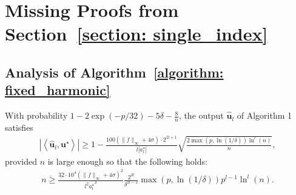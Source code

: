 \documentclass[final,12pt]{colt2018} %
\renewcommand\v[1]{{\ensuremath{\boldsymbol{#1}}}}
\newcommand\ip[1]{\left\langle #1 \right\rangle}
\begin{document}
\section{Missing Proofs from Section~\ref{section: single_index} }
\label{section: single_index_proofs}

\subsection{Analysis of Algorithm~\ref{algorithm: fixed_harmonic}}

\begin{theorem} With probability $1 - 2\exp(-p/32)-5\delta - \frac{8}{n}$, the output $ \hat{\v u}_l$ of Algorithm 1 satisfies
\begin{align*}
    |\ip{\hat{\v u}_l, \v u^\star}| \geq 1 - \frac{100 (\|f\|_\infty + 4\sigma) \cdot 2^{2l+1}}{l|a_l^\star|} \sqrt{\frac{2\max(p,\ln(1/\delta))\ln^l(n)}{n}},
\end{align*}
provided $n$ is large enough so that the following holds:
\begin{align*}
    n \geq \frac{32\cdot 10^4 (\|f\|_\infty + 4\sigma)^2}{{l^2 a_l^\star}^2} \frac{2^{2l}}{\delta^{2l-2}}\max(p,\ln(1/\delta)) p^{l-1} \ln^l(n).
\end{align*}
\label{theorem: algo_1_analysis_restated}
\end{theorem}
\end{document}

